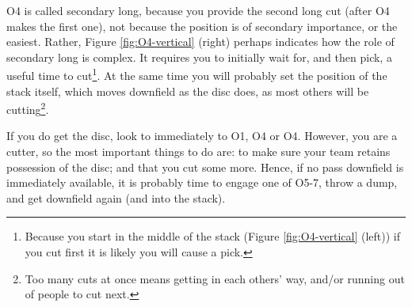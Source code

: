 \documentclass{tufte-handout}
\begin{document}
O4 is called secondary long, 
because you provide the second 
long cut 
(after O4 makes the first one), 
not 
because the position 
is of secondary importance, 
or the easiest. 
Rather, 
Figure \ref{fig:O4-vertical} (right)
perhaps indicates 
how 
the role of 
secondary long 
is complex. 
It requires you to  
initially wait for, 
and then pick, 
a useful time to cut\footnote{
Because you start 
in the middle of the stack 
(Figure \ref{fig:O4-vertical} (left)) 
if you cut first it is likely you will 
cause a pick.}. 
At the same time
you will probably  
set the position 
of the stack itself,
which moves downfield 
as the disc does, 
as most others 
will be  
cutting\footnote{
Too many cuts at once 
means getting 
in each others' way, 
and/or running out of people
to cut next.}. 


If you do get the disc,
look to immediately  
to O1, 
O4 
or O4. 
However, 
you are a cutter, 
so the most 
important things to do are:
to make sure your team 
retains possession of the disc; and
that you cut some more. 
Hence, 
if no pass downfield 
is immediately available, 
it is probably time to engage 
one of O5-7, 
throw a dump, 
and get downfield again 
(and into the stack).
\end{document}
